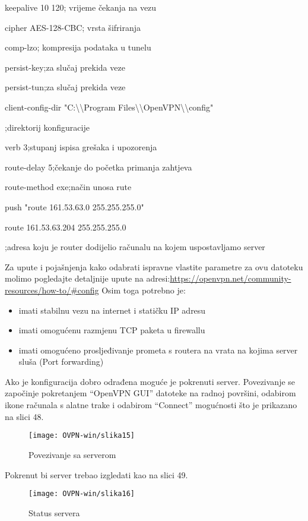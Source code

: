 {keepalive 10 120\hfill; vrijeme čekanja na vezu

cipher AES-128-CBC\hfill; vrsta šifriranja

comp-lzo\hfill; kompresija podataka u tunelu

persist-key\hfill;za slučaj prekida veze

persist-tun\hfill;za slučaj prekida veze

client-config-dir "C:\textbackslash \textbackslash Program Files\textbackslash \textbackslash OpenVPN\textbackslash \textbackslash config"\hfill

;direktorij konfiguracije

verb 3\hfill;stupanj ispisa grešaka i upozorenja

route-delay 5\hfill;čekanje do početka primanja zahtjeva

route-method exe\hfill;način unosa rute

push "route 161.53.63.0 255.255.255.0" 

route 161.53.63.204 255.255.255.0\hfill

;adresa koju je router dodijelio računalu na kojem uspostavljamo server
}\bigbreak
Za upute i pojašnjenja kako odabrati ispravne vlastite parametre za ovu datoteku molimo pogledajte detaljnije upute na adresi:\smallbreak \url{https://openvpn.net/community-resources/how-to/\#config}\smallbreak
Osim toga potrebno je:
\begin{itemize}
	\item imati stabilnu vezu na internet i statičku IP adresu
	\item imati omogućenu razmjenu TCP paketa u firewallu
	\item imati omogućeno prosljeđivanje prometa s routera na vrata na kojima server sluša (Port forwarding)
\end{itemize}	
	
Ako je konfiguracija dobro odrađena moguće je pokrenuti server. Povezivanje se započinje pokretanjem ``OpenVPN GUI'' datoteke na radnoj površini, odabirom ikone računala s alatne trake i odabirom ``Connect'' mogućnosti što je prikazano na slici 48. 
\begin{figure}[h!]
	\centering
     \texttt{[image: OVPN-win/slika15]}
     \caption{Povezivanje sa serverom}
\end{figure}
\FloatBarrier 	
Pokrenut bi server trebao izgledati kao na slici 49.
\begin{figure}[h!]
	\centering
     \texttt{[image: OVPN-win/slika16]}
     \caption{Status servera}
\end{figure}
\FloatBarrier
\newpage
